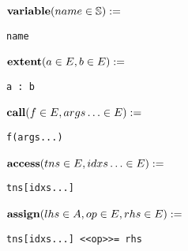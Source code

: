 \noindent\begin{minipage}{.5\linewidth}
\raggedleft $\text{\textbf{variable}}(name \in \mathbb{S}) :=$~
\end{minipage}%
\begin{minipage}{.5\linewidth}
\begin{verbatim}
name
\end{verbatim}
\end{minipage}

\noindent\begin{minipage}{.5\linewidth}
\raggedleft $\text{\textbf{extent}}(a \in E, b \in E) :=$~
\end{minipage}%
\begin{minipage}{.5\linewidth}
\begin{verbatim}
a : b
\end{verbatim}
\end{minipage}

\noindent\begin{minipage}{.5\linewidth}
\raggedleft $\text{\textbf{call}}(f \in E, args\ldots \in E) :=$~
\end{minipage}%
\begin{minipage}{.5\linewidth}
\begin{verbatim}
f(args...)
\end{verbatim}
\end{minipage}
    
\noindent\begin{minipage}{.5\linewidth}
\raggedleft $\text{\textbf{access}}(tns \in E, idxs\ldots \in E) :=$~
\end{minipage}%
\begin{minipage}{.5\linewidth}
\begin{verbatim}
tns[idxs...]
\end{verbatim}
\end{minipage}

\noindent\begin{minipage}{.5\linewidth}
\raggedleft $\text{\textbf{assign}}(lhs \in A, op \in E, rhs \in E) :=$~
\end{minipage}%
\begin{minipage}{.5\linewidth}
\begin{verbatim}
tns[idxs...] <<op>>= rhs
\end{verbatim}
\end{minipage}

